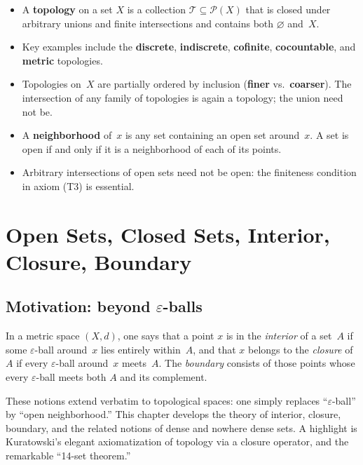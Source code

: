 \documentclass[11pt,a4paper,twoside]{book}
\theoremstyle{remark}
\theoremstyle{definition}
\theoremstyle{definition}
\newcommand{\Tau}{\mathcal{T}}           %
\newcommand{\Pow}{\mathcal{P}}           %
\begin{document}
\begin{itemize}
  \item A \textbf{topology} on a set $X$ is a collection $\Tau\subseteq\Pow(X)$
        that is closed under arbitrary unions and finite intersections and
        contains both $\varnothing$ and~$X$.
  \item Key examples include the \textbf{discrete}, \textbf{indiscrete},
        \textbf{cofinite}, \textbf{cocountable}, and \textbf{metric}
        topologies.
  \item Topologies on~$X$ are partially ordered by inclusion (\textbf{finer} vs.\
        \textbf{coarser}).  The intersection of any family of topologies is
        again a topology; the union need not be.
  \item A \textbf{neighborhood} of~$x$ is any set containing an open set
        around~$x$.  A set is open if and only if it is a neighborhood of each
        of its points.
  \item Arbitrary intersections of open sets need not be open: the
        finiteness condition in axiom (T3) is essential.
\end{itemize}


\chapter{Open Sets, Closed Sets, Interior, Closure, Boundary}
\label{chap:open-closed-interior-closure}

\section*{Motivation: beyond $\varepsilon$-balls}

In a metric space $(X,d)$, one says that a point $x$ is in the \emph{interior}
of a set~$A$ if some $\varepsilon$-ball around~$x$ lies entirely within~$A$,
and that $x$ belongs to the \emph{closure} of~$A$ if every $\varepsilon$-ball
around~$x$ meets~$A$.  The \emph{boundary} consists of those points whose
every $\varepsilon$-ball meets both $A$ and its complement.

These notions extend verbatim to topological spaces: one simply replaces
``$\varepsilon$-ball'' by ``open neighborhood.''  This chapter develops the
theory of interior, closure, boundary, and the related notions of dense and
nowhere dense sets.  A highlight is Kuratowski's elegant axiomatization of
topology via a closure operator, and the remarkable ``14-set theorem.''
\end{document}
